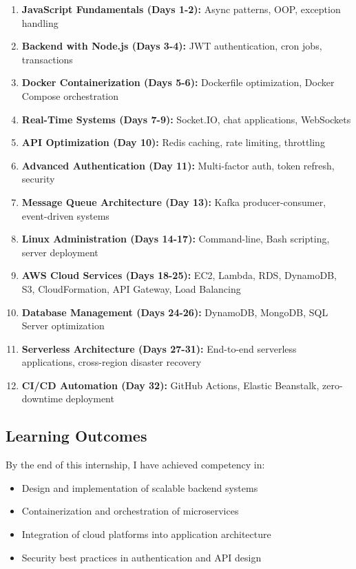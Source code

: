 \begin{enumerate}
    \item \textbf{JavaScript Fundamentals (Days 1-2):} Async patterns, OOP, exception handling
    \item \textbf{Backend with Node.js (Days 3-4):} JWT authentication, cron jobs, transactions  
    \item \textbf{Docker Containerization (Days 5-6):} Dockerfile optimization, Docker Compose orchestration
    \item \textbf{Real-Time Systems (Days 7-9):} Socket.IO, chat applications, WebSockets
    \item \textbf{API Optimization (Day 10):} Redis caching, rate limiting, throttling
    \item \textbf{Advanced Authentication (Day 11):} Multi-factor auth, token refresh, security
    \item \textbf{Message Queue Architecture (Day 13):} Kafka producer-consumer, event-driven systems
    \item \textbf{Linux Administration (Days 14-17):} Command-line, Bash scripting, server deployment
    \item \textbf{AWS Cloud Services (Days 18-25):} EC2, Lambda, RDS, DynamoDB, S3, CloudFormation, API Gateway, Load Balancing
    \item \textbf{Database Management (Days 24-26):} DynamoDB, MongoDB, SQL Server optimization
    \item \textbf{Serverless Architecture (Days 27-31):} End-to-end serverless applications, cross-region disaster recovery
    \item \textbf{CI/CD Automation (Day 32):} GitHub Actions, Elastic Beanstalk, zero-downtime deployment
\end{enumerate}

\subsection{Learning Outcomes}

By the end of this internship, I have achieved competency in:
\begin{itemize}
    \item Design and implementation of scalable backend systems
    \item Containerization and orchestration of microservices
    \item Integration of cloud platforms into application architecture
    \item Security best practices in authentication and API design
\end{itemize}
